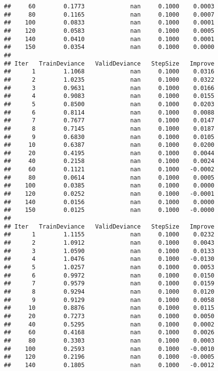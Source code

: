 \documentclass[]{article}
\begin{document}
\begin{verbatim}
##     60        0.1773             nan     0.1000    0.0003
##     80        0.1165             nan     0.1000    0.0007
##    100        0.0833             nan     0.1000    0.0001
##    120        0.0583             nan     0.1000    0.0005
##    140        0.0410             nan     0.1000    0.0001
##    150        0.0354             nan     0.1000    0.0000
## 
## Iter   TrainDeviance   ValidDeviance   StepSize   Improve
##      1        1.1068             nan     0.1000    0.0316
##      2        1.0235             nan     0.1000    0.0322
##      3        0.9631             nan     0.1000    0.0166
##      4        0.9083             nan     0.1000    0.0155
##      5        0.8500             nan     0.1000    0.0203
##      6        0.8114             nan     0.1000    0.0088
##      7        0.7677             nan     0.1000    0.0147
##      8        0.7145             nan     0.1000    0.0187
##      9        0.6830             nan     0.1000    0.0105
##     10        0.6387             nan     0.1000    0.0200
##     20        0.4195             nan     0.1000    0.0044
##     40        0.2158             nan     0.1000    0.0024
##     60        0.1121             nan     0.1000   -0.0002
##     80        0.0614             nan     0.1000    0.0005
##    100        0.0385             nan     0.1000    0.0000
##    120        0.0252             nan     0.1000   -0.0001
##    140        0.0156             nan     0.1000    0.0000
##    150        0.0125             nan     0.1000   -0.0000
## 
## Iter   TrainDeviance   ValidDeviance   StepSize   Improve
##      1        1.1155             nan     0.1000    0.0232
##      2        1.0912             nan     0.1000    0.0043
##      3        1.0590             nan     0.1000    0.0133
##      4        1.0476             nan     0.1000   -0.0130
##      5        1.0257             nan     0.1000    0.0053
##      6        0.9972             nan     0.1000    0.0150
##      7        0.9579             nan     0.1000    0.0159
##      8        0.9294             nan     0.1000    0.0120
##      9        0.9129             nan     0.1000    0.0058
##     10        0.8876             nan     0.1000    0.0115
##     20        0.7273             nan     0.1000    0.0050
##     40        0.5295             nan     0.1000    0.0002
##     60        0.4168             nan     0.1000    0.0026
##     80        0.3303             nan     0.1000    0.0003
##    100        0.2593             nan     0.1000   -0.0010
##    120        0.2196             nan     0.1000   -0.0005
##    140        0.1805             nan     0.1000   -0.0012

\end{verbatim}
\end{document}
